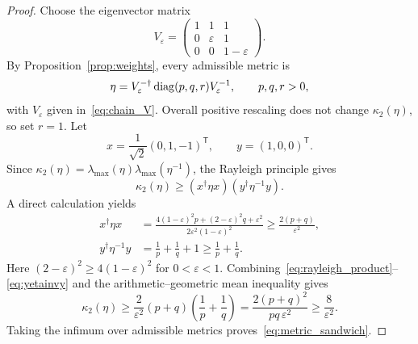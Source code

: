 \begin{proof}
Choose the eigenvector matrix
\begin{equation}\label{eq:chain_V}
 V_\varepsilon=\begin{pmatrix}1&1&1\\0&\varepsilon&1\\0&0&1-\varepsilon\end{pmatrix}.
\end{equation}
By Proposition~\ref{prop:weights}, every admissible metric is
\begin{equation}
 \eta=V_\varepsilon^{-\dagger}\operatorname{diag}(p,q,r)V_\varepsilon^{-1},
 \qquad p,q,r>0,
\end{equation}
with $V_\varepsilon$ given in~\eqref{eq:chain_V}.  Overall positive
rescaling does not change $\kappa_2(\eta)$, so set $r=1$.  Let
\begin{equation}
 x=\frac{1}{\sqrt2}(0,1,-1)^\mathsf{T},\qquad y=(1,0,0)^\mathsf{T}.
\end{equation}
Since $\kappa_2(\eta)=\lambda_{\max}(\eta)
\lambda_{\max}(\eta^{-1})$, the Rayleigh principle gives
\begin{equation}\label{eq:rayleigh_product}
 \kappa_2(\eta)\geq(x^\dagger\eta x)(y^\dagger\eta^{-1}y).
\end{equation}
A direct calculation yields
\begin{align}
 x^\dagger\eta x
 &=\frac{4(1-\varepsilon)^2p+(2-\varepsilon)^2q+\varepsilon^2}
 {2\varepsilon^2(1-\varepsilon)^2}
 \geq \frac{2(p+q)}{\varepsilon^2},\label{eq:xetax}\\
 y^\dagger\eta^{-1}y&=\frac1p+\frac1q+1
 \geq\frac1p+\frac1q.\label{eq:yetainvy}
\end{align}
Here $(2-\varepsilon)^2\geq4(1-\varepsilon)^2$ for
$0<\varepsilon<1$.  Combining~\eqref{eq:rayleigh_product}--
\eqref{eq:yetainvy} and the arithmetic--geometric mean inequality gives
\begin{equation}
 \kappa_2(\eta)\geq
 \frac{2}{\varepsilon^2}(p+q)
 \left(\frac1p+\frac1q\right)
 =\frac{2(p+q)^2}{pq\,\varepsilon^2}
 \geq\frac8{\varepsilon^2}.
\end{equation}
Taking the infimum over admissible metrics proves~\eqref{eq:metric_sandwich}.


\end{proof}
